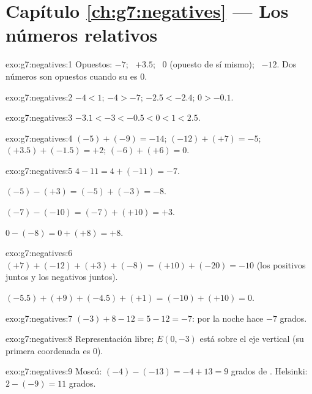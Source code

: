 \section*{Capítulo \ref{ch:g7:negatives} --- Los números relativos}

\begin{solution}{exo:g7:negatives:1}
Opuestos: $-7$; \ $+3.5$; \ $0$ (opuesto de sí mismo); \ $-12$. Dos
números son opuestos cuando su  es $0$.
\end{solution}

\begin{solution}{exo:g7:negatives:2}
$-4 < 1$; \quad $-4 > -7$; \quad $-2.5 < -2.4$; \quad $0 > -0.1$.
\end{solution}

\begin{solution}{exo:g7:negatives:3}
$-3.1 < -3 < -0.5 < 0 < 1 < 2.5$.
\end{solution}

\begin{solution}{exo:g7:negatives:4}
$(-5) + (-9) = -14$; \quad
$(-12) + (+7) = -5$; \quad
$(+3.5) + (-1.5) = +2$; \quad
$(-6) + (+6) = 0$.
\end{solution}

\begin{solution}{exo:g7:negatives:5}
$4 - 11 = 4 + (-11) = -7$.

$(-5) - (+3) = (-5) + (-3) = -8$.

$(-7) - (-10) = (-7) + (+10) = +3$.

$0 - (-8) = 0 + (+8) = +8$.
\end{solution}

\begin{solution}{exo:g7:negatives:6}
$(+7) + (-12) + (+3) + (-8) = (+10) + (-20) = -10$ (los positivos
juntos y los negativos juntos).

$(-5.5) + (+9) + (-4.5) + (+1) = (-10) + (+10) = 0$.
\end{solution}

\begin{solution}{exo:g7:negatives:7}
$(-3) + 8 - 12 = 5 - 12 = -7$: por la noche hace $-7$ grados.
\end{solution}

\begin{solution}{exo:g7:negatives:8}
Representación libre; $E(0, -3)$ está sobre el eje vertical (su primera coordenada
es $0$).
\end{solution}

\begin{solution}{exo:g7:negatives:9}
Moscú: $(-4) - (-13) = -4 + 13 = 9$ grados de .
Helsinki: $2 - (-9) = 11$ grados.
\end{solution}

